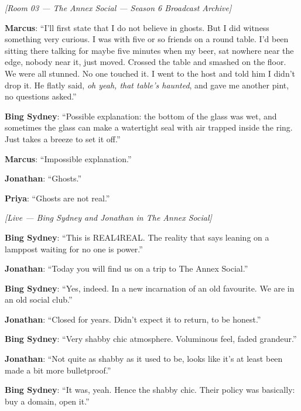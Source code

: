 \medskip
\begin{center}
{\small\sffamily\color{nullmesh-ghost}\textit{[Room 03 --- The Annex Social --- Season 6 Broadcast Archive]}}
\end{center}
\medskip

\noindent\textbf{Marcus}: ``I'll first state that I do not believe in ghosts. But I did witness something very curious. I was with five or so friends on a round table. I'd been sitting there talking for maybe five minutes when my beer, sat nowhere near the edge, nobody near it, just moved. Crossed the table and smashed on the floor. We were all stunned. No one touched it. I went to the host and told him I didn't drop it. He flatly said, \textit{oh yeah, that table's haunted}, and gave me another pint, no questions asked.''

\noindent\textbf{Bing Sydney}: ``Possible explanation: the bottom of the glass was wet, and sometimes the glass can make a watertight seal with air trapped inside the ring. Just takes a breeze to set it off.''

\noindent\textbf{Marcus}: ``Impossible explanation.''

\noindent\textbf{Jonathan}: ``Ghosts.''

\noindent\textbf{Priya}: ``Ghosts are not real.''

\medskip
\begin{center}
{\small\sffamily\color{nullmesh-ghost}\textit{[Live --- Bing Sydney and Jonathan in The Annex Social]}}
\end{center}
\medskip

\noindent\textbf{Bing Sydney}: ``This is REAL4REAL. The reality that says leaning on a lamppost waiting for no one is power.''

\noindent\textbf{Jonathan}: ``Today you will find us on a trip to The Annex Social.''

\noindent\textbf{Bing Sydney}: ``Yes, indeed. In a new incarnation of an old favourite. We are in an old social club.''

\noindent\textbf{Jonathan}: ``Closed for years. Didn't expect it to return, to be honest.''

\noindent\textbf{Bing Sydney}: ``Very shabby chic atmosphere. Voluminous feel, faded grandeur.''

\noindent\textbf{Jonathan}: ``Not quite as shabby as it used to be, looks like it's at least been made a bit more bulletproof.''

\noindent\textbf{Bing Sydney}: ``It was, yeah. Hence the shabby chic. Their policy was basically: buy a domain, open it.''

